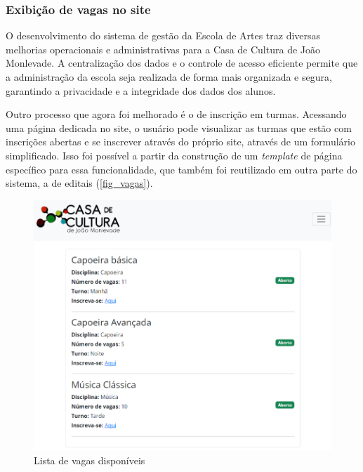 \subsubsection{Exibição de vagas no site}

O desenvolvimento do sistema de gestão da Escola de Artes traz diversas melhorias operacionais e administrativas para a Casa de Cultura de João Monlevade. A centralização dos dados e o controle de acesso eficiente permite que a administração da escola seja realizada de forma mais organizada e segura, garantindo a privacidade e a integridade dos dados dos alunos.

Outro processo que agora foi melhorado é o de inscrição em turmas. Acessando uma página dedicada no site, o usuário pode visualizar as turmas que estão com inscrições abertas e se inscrever através do próprio site, através de um formulário simplificado. Isso foi possível a partir da construção de um \textit{template} de página específico para essa funcionalidade, que também foi reutilizado em outra parte do sistema, a de editais (\autoref{fig_vagas}).

\begin{figure}[htb]
	\caption{\label{fig_vagas}Lista de vagas disponíveis}
	\begin{center}
	    \includegraphics[scale=0.5]{./img/lista_turmas.png}
	\end{center}
\end{figure}

